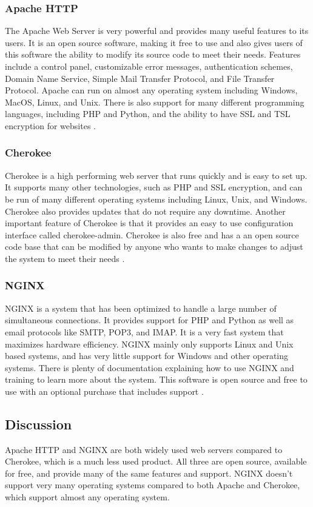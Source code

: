 \documentclass[onecolumn, draftclsnofoot,10pt, compsoc]{IEEEtran}
\begin{document}
\subsubsection{Apache HTTP}
The Apache Web Server is very powerful and provides many useful features to its users. It is an open source software, making it free to use and also gives users of this software the ability to modify its source code to meet their needs. Features include a control panel, customizable error messages, authentication schemes, Domain Name Service, Simple Mail Transfer Protocol, and File Transfer Protocol. Apache can run on almost any operating system including Windows, MacOS, Linux, and Unix. There is also support for many different programming languages, including PHP and Python, and the ability to have SSL and TSL encryption for websites \cite{apache}.

\subsubsection{Cherokee}
Cherokee is a high performing web server that runs quickly and is easy to set up. It supports many other technologies, such as PHP and SSL encryption, and can be run of many different operating systems including Linux, Unix, and Windows. Cherokee also provides updates that do not require any downtime. Another important feature of Cherokee is that it provides an easy to use configuration interface called cherokee-admin. Cherokee is also free and has a an open source code base that can be modified by anyone who wants to make changes to adjust the system to meet their needs \cite{cherokee}.

\subsubsection{NGINX}
NGINX is a system that has been optimized to handle a large number of simultaneous connections. It provides support for PHP and Python as well as email protocols like SMTP, POP3, and IMAP. It is a very fast system that maximizes hardware efficiency. NGINX mainly only supports Linux and Unix based systems, and has very little support for Windows and other operating systems. There is plenty of documentation explaining how to use NGINX and training to learn more about the system. This software is open source and free to use with an optional purchase that includes support \cite{nginx}.

\subsection{Discussion}
Apache HTTP and NGINX are both widely used web servers compared to Cherokee, which is a much less used product. All three are open source, available for free, and provide many of the same features and support. NGINX doesn't support very many operating systems compared to both Apache and Cherokee, which support almost any operating system.
\end{document}
